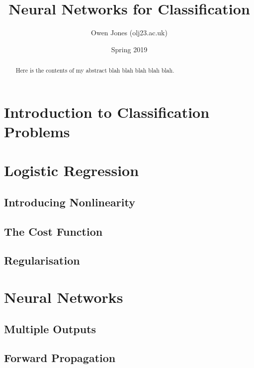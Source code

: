 \documentclass{article}
\begin{document}
	
	
	\title{Neural Networks for Classification}
	\author{Owen Jones (olj23\@bath.ac.uk)}
	\date{Spring 2019}
	\maketitle


\begin{abstract}
	Here is the contents of my abstract blah blah blah blah blah.
\end{abstract}



\section{Introduction to Classification Problems}



\section{Logistic Regression}

    \subsection{Introducing Nonlinearity}

    \subsection{The Cost Function}

    \subsection{Regularisation}



\section{Neural Networks}

    \subsection{Multiple Outputs}
    
    \subsection{Forward Propagation}
\end{document}
